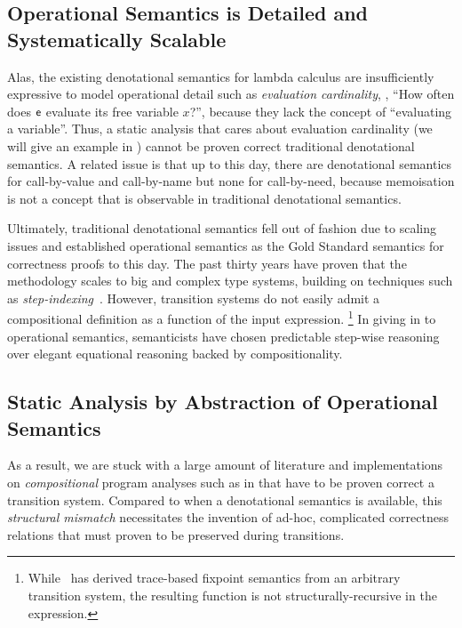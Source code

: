 \subsection{Operational Semantics is Detailed and Systematically Scalable}

Alas, the existing denotational semantics for lambda calculus are insufficiently
expressive to model operational detail such as \emph{evaluation cardinality},
\eg, ``How often does $\mathsf{e}$ evaluate its free variable $x$?'', because they lack
the concept of ``evaluating a variable''.
Thus, a static analysis that cares about evaluation cardinality (we will give
an example in ) cannot be proven correct \wrt traditional
denotational semantics.
A related issue is that up to this day, there are denotational semantics for
call-by-value and call-by-name but none for call-by-need, because memoisation is
not a concept that is observable in traditional denotational semantics.

Ultimately, traditional denotational semantics fell out of fashion due to
scaling issues and \citet{WrightFelleisen:94} established operational semantics
as the Gold Standard semantics for correctness proofs to this day.
The past thirty years have proven that the methodology scales to
big and complex type systems, building on techniques such as
\emph{step-indexing}~\citep{AppelMcAllester:01,DreyerAhmedBirkedal:11}.
However, transition systems do not easily admit a compositional definition as a
function of the input expression.%
\footnote{While~\citet{Cousot:02} has derived trace-based fixpoint
semantics from an arbitrary transition system, the resulting function is not
structurally-recursive in the expression.}
In giving in to operational semantics, semanticists have chosen predictable
step-wise reasoning over elegant equational reasoning backed by
compositionality.


\subsection{Static Analysis by Abstraction of Operational Semantics}

As a result, we are stuck with a large amount of literature and implementations
on \emph{compositional} program analyses such as in \citet{cardinality-ext}
that have to be proven correct \wrt a transition system.
Compared to when a denotational semantics is available, this \emph{structural
mismatch} necessitates the invention of ad-hoc, complicated correctness
relations that must proven to be preserved during transitions.

